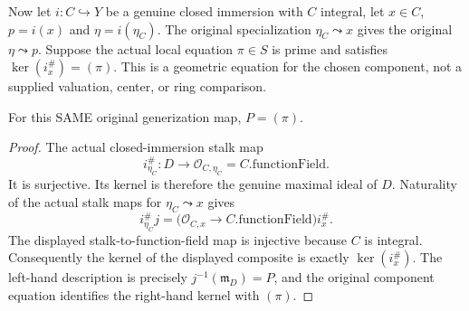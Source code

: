 Now let $i:C\hookrightarrow Y$ be a genuine closed immersion with $C$
integral, let $x\in C$, $p=i(x)$ and $\eta=i(\eta_C)$. The original
specialization $\eta_C\leadsto x$ gives the original
$\eta\leadsto p$. Suppose the actual local equation $\pi\in S$ is prime
and satisfies $\ker(i_x^\#)=(\pi)$. This is a geometric equation for the
chosen component, not a supplied valuation, center, or ring comparison.

\begin{lemma}
\label{lem:gauss-common-original-component-prime}
\leanok
For this SAME original generization map, $P=(\pi)$.
\end{lemma}
\begin{proof}
The actual closed-immersion stalk map
\[
 i_{\eta_C}^\#:D\to\mathcal O_{C,\eta_C}=C.\mathrm{functionField}.
\]
It is surjective. Its kernel is therefore the genuine maximal ideal of $D$.
Naturality of the actual stalk maps for $\eta_C\leadsto x$ gives
\[
 i_{\eta_C}^\# j
 =\bigl(\mathcal O_{C,x}\longrightarrow C.\mathrm{functionField}\bigr)i_x^\#.
\]
The displayed stalk-to-function-field map is injective because $C$ is
integral. Consequently the kernel of the displayed composite is exactly
$\ker(i_x^\#)$. The left-hand description is precisely
$j^{-1}(\mathfrak m_D)=P$, and the original component equation identifies
the right-hand kernel with $(\pi)$.
\end{proof}

